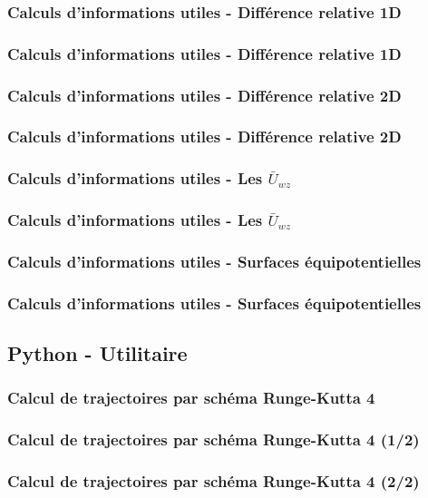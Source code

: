 \documentclass{beamer}
\begin{document}
	\subsubsection{Calculs d'informations utiles - Différence relative 1D}
	\begin{frame}
		\frametitle{Calculs d'informations utiles - Différence relative 1D}
		
	\end{frame}
	
	\subsubsection{Calculs d'informations utiles - Différence relative 2D}
	\begin{frame}
		\frametitle{Calculs d'informations utiles - Différence relative 2D}
		
	\end{frame}
	
	\subsubsection{Calculs d'informations utiles - Les $\bar{U}_{wz}$}
	\begin{frame}
		\frametitle{Calculs d'informations utiles - Les $\bar{U}_{wz}$}
		
	\end{frame}
	
	\subsubsection{Calculs d'informations utiles - Surfaces équipotentielles}
	\begin{frame}
		\frametitle{Calculs d'informations utiles - Surfaces équipotentielles}
		
	\end{frame}
	
	
	
	
	
	\subsection{Python - Utilitaire}
	\subsubsection{Calcul de trajectoires par schéma Runge-Kutta 4}
	\begin{frame}
		\frametitle{Calcul de trajectoires par schéma Runge-Kutta 4 (1/2)}
		
	\end{frame}
	\begin{frame}
		\frametitle{Calcul de trajectoires par schéma Runge-Kutta 4 (2/2)}
		
	\end{frame}
	
\end{document}

